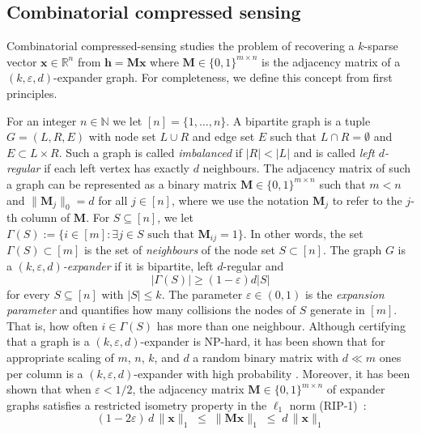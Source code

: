 \documentclass{article}
\theoremstyle{plain}
\theoremstyle{definition}
\theoremstyle{remark}
\begin{document}
\subsection{Combinatorial compressed sensing}
\label{sec:background_expanders}

Combinatorial compressed-sensing studies the problem of recovering a $k$-sparse vector $\mathbf{x} \in \mathbb{R}^n$ from $\mathbf{h} = \mathbf{M} \mathbf{x}$ where $\mathbf{M} \in \{0,1\}^{m \times n}$ is the adjacency matrix of a $(k, \varepsilon, d)$-expander graph.
%
For completeness, we define this concept from first principles.
%

For an integer $n \in \mathbb{N}$ we let $[n] = \{1, \dots, n\}$.
%
A bipartite graph is a tuple $G = (L, R, E)$ with node set $L \cup R$ and edge set $E$ such that $L \cap R = \emptyset$ and $E \subset L \times R$.
%
Such a graph is called {\em imbalanced} if $|R| < |L|$ and is called {\em left $d$-regular} if each left vertex has exactly $d$ neighbours.
%
The adjacency matrix of such a graph can be represented as a binary matrix $\mathbf{M} \in \{0,1\}^{m \times n}$ such that $m < n$ and $\|\mathbf{M}_j\|_0 = d$ for all $j \in [n]$, where we use the notation $\mathbf{M}_j$ to refer to the $j$-th column of $\mathbf{M}$.
%
For $S\subseteq[n]$, we let $\Gamma(S):=\{i\in[m]: \exists j\in S \text{ such that } \mathbf{M}_{ij}=1\}$. In other words, the set $\Gamma(S) \subset [m]$ is the set of {\em neighbours} of the node set $S \subset [n]$.
%
The graph $G$ is a \emph{$(k, \varepsilon, d)$-expander} if it is bipartite, left $d$-regular and 
%
\begin{equation}
    |\Gamma(S)| \ge (1 - \varepsilon) d |S|
\end{equation}
%
for every $S \subseteq [n]$ with $|S| \le k$.
%
The parameter $\varepsilon \in (0,1)$ is the {\em expansion parameter} and quantifies how many collisions the nodes of $S$ generate in $[m]$.
%
That is, how often $i \in \Gamma(S)$ has more than one neighbour. 
%
Although certifying that a graph is a $(k, \varepsilon, d)$-expander is NP-hard, it has been shown that for appropriate scaling of $m$, $n$, $k$, and $d$ a random binary matrix with $d \ll m$ ones per column is a $(k, \varepsilon, d)$-expander with high probability \citep{bah2013vanishingly}. 
%
Moreover, it has been shown that when $\varepsilon < 1/2$, the adjacency matrix $\mathbf{M} \in \{0,1\}^{m \times n}$ of expander graphs satisfies a restricted isometry property in the $\ell_1$ norm (RIP-1)~\citep{berinde2008combining}:
%
\begin{equation}
    \label{eq:rip1}
    (1 - 2\varepsilon)\,d\,\|\mathbf{x}\|_1 \;\le\; \|\mathbf{M}\mathbf{x}\|_1 \;\le\; d\,\|\mathbf{x}\|_1
\end{equation}
\end{document}
